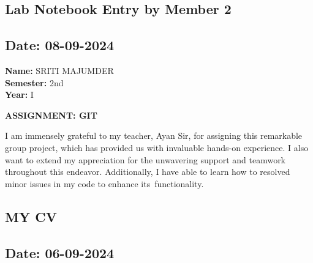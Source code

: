 \documentclass[12pt]{article}
\begin{document}
\subsection*{Lab Notebook Entry by Member 2}
\subsection*{Date: 08-09-2024}

\begin{flushright}
\textbf{Name:} SRITI MAJUMDER \\
\textbf{Semester:} 2nd \\
\textbf{Year:} I \\
\end{flushright}

\begin{center}
\Huge \textbf{ASSIGNMENT: GIT}
\end{center}

I am immensely grateful to my teacher, Ayan Sir, for assigning this remarkable group project, which has provided us with invaluable hands-on experience. I also want to extend my appreciation for the unwavering support and teamwork throughout this endeavor. Additionally, I have able to learn how to  resolved minor issues in my  code to enhance its functionality.


\newpage
\subsection*{MY CV}
\subsection*{Date: 06-09-2024}
\end{document}
